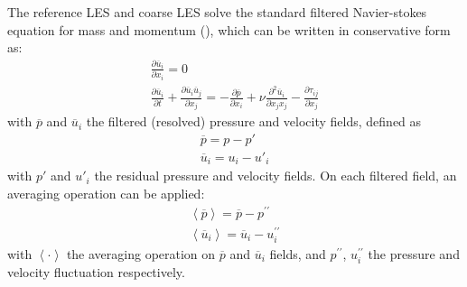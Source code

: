 The reference LES and coarse LES solve the standard filtered Navier-stokes equation for mass and momentum (\textcite{Smagorinsky1963}), which can be written in conservative form as:
\begin{subequations}\label{subequ: fitlered Navier-Stokes}
	\begin{gather}
		\frac{\partial \overline{u}_i}{\partial x_i} = 0
		\label{equ - filtered mass}
		\\
		\frac{\partial \overline{u}_i}{\partial t}+ \frac{\partial \overline{u}_i \overline{u}_j}{\partial x_j}=-\frac{\partial \overline{p}}{\partial x_i}+\nu \frac{\partial^2 \overline{u}_i}{\partial x_{j}x_{j}}-\frac{\partial \tau_{ij}}{\partial x_j}
		\label{equ - filtered momentum}
	\end{gather}
\end{subequations}
with $\overline{p}$ and $\overline{u}_i$ the filtered (resolved) pressure and velocity fields, defined as
\begin{subequations}\label{subequ: filtering operation}
	\begin{gather}
		\overline{p}=p-p'
		\label{equ: p filterering}
		\\
		\overline{u}_i=u_i-u'_i
		\label{equ: u filterering}
	\end{gather}
\end{subequations}
with $p'$ and $u'_i$ the residual pressure and velocity fields. On each filtered field, an averaging operation can be applied:
\begin{subequations}\label{subequ: averaging operation}
	\begin{gather}
		\left\langle \overline{p} \right\rangle = \overline{p} - p^{\prime\prime}
		\label{equ: p averaging}
		\\
		\left\langle \overline{u}_i \right\rangle = \overline{u}_i - u_i^{\prime\prime}
		\label{equ: u averaging}
	\end{gather}
\end{subequations}
with $\left\langle \cdot \right\rangle$ the averaging operation on $\overline{p}$ and $\overline{u}_i$ fields,  and $p^{\prime\prime}$, $u_i^{\prime\prime}$ the pressure and velocity fluctuation respectively.

